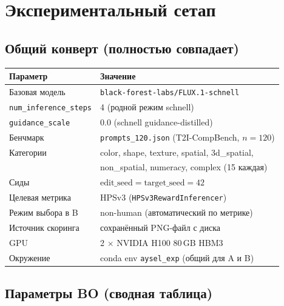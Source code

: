 \documentclass[11pt,a4paper]{article}
\begin{document}
\section{Экспериментальный сетап}

\subsection{Общий конверт (полностью совпадает)}

\begin{center}
\begin{tabular}{ll}
\toprule
Параметр & Значение \\
\midrule
Базовая модель                 & \texttt{black-forest-labs/FLUX.1-schnell} \\
\texttt{num\_inference\_steps} & 4 (родной режим schnell) \\
\texttt{guidance\_scale}       & 0.0 (schnell guidance-distilled) \\
Бенчмарк                       & \texttt{prompts\_120.json} (T2I-CompBench, $n=120$) \\
Категории                      & color, shape, texture, spatial, 3d\_spatial, \\
                               & non\_spatial, numeracy, complex (15 каждая) \\
Сиды                           & $\text{edit\_seed} = \text{target\_seed} = 42$ \\
Целевая метрика                & HPSv3 (\texttt{HPSv3RewardInferencer}) \\
Режим выбора в B               & non-human (автоматический по метрике) \\
Источник скоринга              & сохранённый PNG-файл с диска \\
GPU                            & 2 $\times$ NVIDIA H100 80\,GB HBM3 \\
Окружение                      & conda env \texttt{aysel\_exp} (общий для A и B) \\
\bottomrule
\end{tabular}
\end{center}

\subsection{Параметры BO (сводная таблица)}
\end{document}
